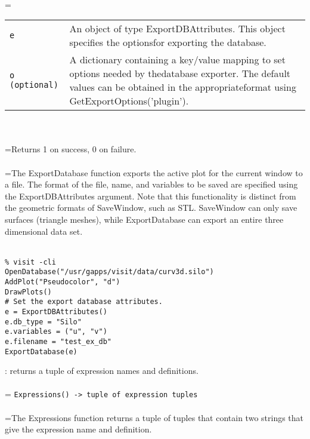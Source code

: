 \documentclass[10pt,a4paper]{report}
\begin{document}
 \\ 
\hangindent=\parindent 
\begin{tabular}{lp{9cm}}
\verb!e! & An object of type ExportDBAttributes.  This object specifies the optionsfor exporting the database. \\
\verb!o (optional)! & A dictionary containing a key/value mapping to set options needed by thedatabase exporter.  The default values can be obtained in the appropriateformat using GetExportOptions('plugin'). \\
\end{tabular} \\[-2mm]


 \\ 
\hangindent=\parindent Returns 1 on success, 0 on failure. \\[-3mm] 

 \\ 
\hangindent=\parindent The ExportDatabase function exports the active plot for the current window to a file.  The format of the file, name, and variables to be saved are specified using the ExportDBAttributes argument. Note that this functionality is distinct from the geometric formats of SaveWindow, such as STL.  SaveWindow can only save surfaces (triangle meshes), while ExportDatabase can export an entire three dimensional data set. \\[-3mm] 

\\[-6mm]
\begin{verbatim}% visit -cli
OpenDatabase("/usr/gapps/visit/data/curv3d.silo")
AddPlot("Pseudocolor", "d")
DrawPlots()
# Set the export database attributes.
e = ExportDBAttributes()
e.db_type = "Silo"
e.variables = ("u", "v")
e.filename = "test_ex_db"
ExportDatabase(e)
\end{verbatim}
\newpage


{}
: returns a tuple of expression names and definitions.\\[-3mm]

 \\ 
\hangindent=\parindent 
\verb!Expressions() -> tuple of expression tuples!\\ [-3mm]

 \\ 
\hangindent=\parindent The Expressions function returns a tuple of tuples that contain two strings that give the expression name and definition.  \\[-3mm] 
\end{document}
